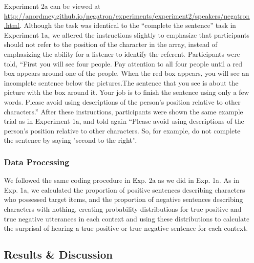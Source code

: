 \documentclass[man, floatsintext, noapacite]{apa6}
\begin{document}
Experiment 2a can be viewed at \url{http://anordmey.github.io/negatron/experiments/experiment2/speakers/negatron.html}. Although the task was identical to the ``complete the sentence'' task in Experiment 1a, we altered the instructions slightly to emphasize that participants should not refer to the position of the character in the array, instead of emphasizing the ability for a listener to identify the referent. Participants were told, ``First you will see four people. Pay attention to all four people until a red box appears around one of the people. When the red box appears, you will see an incomplete sentence below the pictures.The sentence that you see is about the picture with the box around it. Your job is to finish the sentence using only a few words. Please avoid using descriptions of the person's position relative to other characters.'' After these instructions, participants were shown the same example trial as in Experiment 1a, and told again ``Please avoid using descriptions of the person's position relative to other characters. So, for example, do not complete the sentence by saying "second to the right".

\subsubsection{Data Processing} 

We followed the same coding procedure in Exp. 2a as we did in Exp. 1a. As in Exp. 1a, we calculated the proportion of positive sentences describing characters who possessed target items, and the proportion of negative sentences describing characters with nothing, creating probability distributions for true positive and true negative utterances in each context and using these distributions to calculate the surprisal of hearing a true positive or true negative sentence for each context. 


\subsection{Results \& Discussion}
\end{document}
